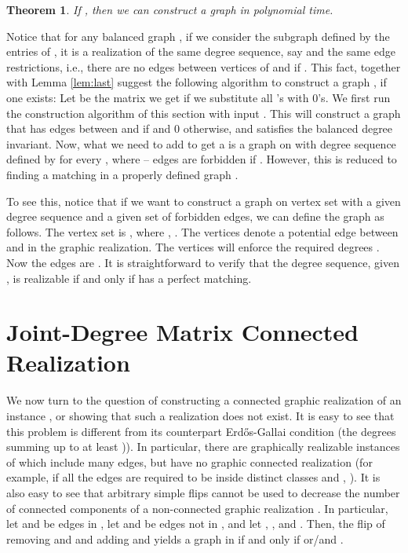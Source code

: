 \documentclass[12pt,a4paper]{article}
\theoremstyle{definition}
\theoremstyle{plain}
\newtheorem{thm}[dfn]{Theorem}
\newenvironment{prf}{\noindent {\bf Proof.}}{\begin{flushright}\vspace{-2em}\footnotesize\normalsize\end{flushright}\smallskip}
\begin{document}
\begin{thm}\label{thm:*gener}
If , then we can construct a graph 
in polynomial time.
\end{thm}
\begin{prf} Notice that for any balanced graph ,
if we consider the subgraph  defined by the  entries of
, it is a realization
of the same degree sequence, 
say  and the same
edge restrictions, i.e.,
there are no edges between vertices of  and  if .
This fact, together with Lemma \ref{lem:last} suggest the following algorithm
to construct a graph , if one exists:
Let  be the matrix we get if we substitute all 's with 0's.
We first run the construction algorithm of this section 
with input .
This will construct a graph  that has  edges between
 and  if  and 0 otherwise, and satisfies the
balanced degree invariant.
Now, what we need to add to get a 
is a graph on  with degree sequence defined by 
for every , where -- edges are forbidden if .
However, this is reduced to finding a matching in a properly defined graph 
. 

To see this, notice that if we want to construct a graph on vertex set
 with a given 
degree sequence  and a given set  of forbidden edges,
we can define the graph 
as follows.
The vertex set is ,
where ,
              .
The vertices  denote a potential
edge between  and  in the graphic realization.
The vertices  will enforce the required degrees .
Now the edges are
.
It is straightforward to verify that
the degree sequence, given , is realizable
if and only if  
has a perfect matching.
\end{prf}



\section{Joint-Degree Matrix Connected Realization}
\label{sec:algorithm2}



We now turn to the question of constructing a connected graphic
realization of an instance ,
or showing that such a realization does not exist.
It is easy to see that this problem
is different from its counterpart
Erd\H{o}s-Gallai condition (the degrees summing up
to at least )).
In particular, there are graphically realizable instances
of  which include many edges,
but have no graphic connected realization
(for example, if all the edges are required to be inside distinct 
classes  and , ).
It is also easy to see that arbitrary simple flips
cannot be used to decrease the number of connected components
of a non-connected graphic realization .
In particular, let  and  be edges in ,
let  and  be edges not in ,
and let , , 
and .
Then, the flip of removing  and 
and adding  and  yields
a graph in  
if and only if 
or/and  .
\end{document}
